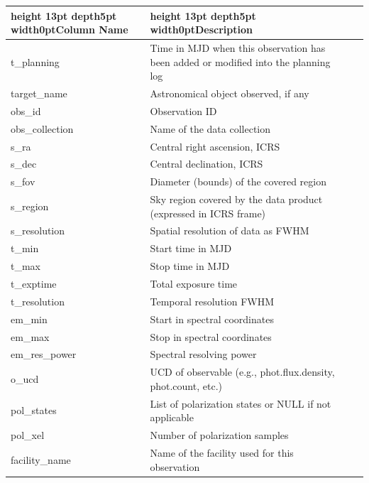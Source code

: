 \documentclass[11pt,a4paper]{ivoa}
\begin{document}
\begin{landscape}
\begin{table}
\def\hlstrut{\vrule height 13pt depth5pt width0pt}
\begin{tabular}{ |l|l|l|l| }
\hline
\hlstrut\textbf{Column Name} &
\hlstrut\textbf{Description} \\
\hline
t\_planning &
Time in MJD when this observation has been added or modified into the
planning log \\
\hline
target\_name &
Astronomical object observed, if any \\
\hline
obs\_id &
Observation ID \\
\hline
obs\_collection &
Name of the data collection \\
\hline
s\_ra &
Central right ascension, ICRS \\
\hline
s\_dec &
Central declination, ICRS \\
\hline
s\_fov  &
Diameter (bounds) of the covered region \\
\hline
s\_region &
Sky region covered by the data product (expressed in ICRS frame) \\
\hline
s\_resolution &
Spatial resolution of data as FWHM \\
\hline
t\_min &
Start time in MJD \\
\hline
t\_max &
Stop time in MJD \\
\hline
t\_exptime &
Total exposure time \\
\hline
t\_resolution &
Temporal resolution FWHM \\
\hline
em\_min &
Start in spectral coordinates \\
\hline
em\_max &
Stop in spectral coordinates \\
\hline
em\_res\_power &
Spectral resolving power \\
\hline
o\_ucd &
UCD of observable (e.g., phot.flux.density, phot.count, etc.) \\
\hline
pol\_states &
List of polarization states or NULL if not applicable \\
\hline
pol\_xel &
Number of polarization samples \\
\hline
facility\_name &
Name of the facility used for this observation \\
\hline

\end{tabular}
\end{table}
\end{landscape}
\end{document}
